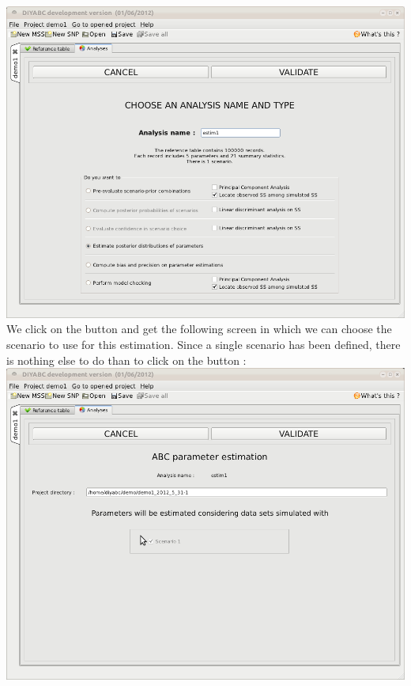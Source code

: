 \includegraphics[scale=0.35]{gui_pictures/Capture-DIYABC-34.png} \\
 
We click on the  button and get the following screen in which we can choose the scenario to use for this estimation. Since a single scenario has been defined, there is nothing else to do than to click on the  button : \\

\includegraphics[scale=0.35]{gui_pictures/Capture-DIYABC-35.png} \\
 
